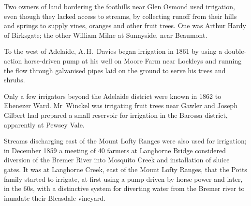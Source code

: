 Two owners of land bordering the foothills near Glen Osmond used
irrigation, even though they lacked access to streams, by collecting
runoff from their hills and springs to supply vines, oranges and other
fruit trees.  One was Arthur Hardy of Birksgate; the other William
Milne at Sunnyside, near Beaumont.

To the west of Adelaide, A.\,H.~Davies began irrigation in 1861 by
using a double-action horse-driven pump at his well on Moore Farm near
Lockleys and running the flow through galvanised pipes laid on the
ground to serve his trees and shrubs.

Only a few irrigators beyond the Adelaide district were known in 1862
to Ebenezer Ward.  Mr~Winckel was irrigating fruit trees near Gawler
and Joseph Gilbert had prepared a small reservoir for irrigation in
the Barossa district, apparently at Pewsey
Vale.

Streams discharging east of the Mount Lofty Ranges were also used for
irrigation; in December 1859 a meeting of 40 farmers at Langhorne
Bridge considered diversion of the Bremer River into Mosquito Creek
and installation of sluice gates.  It was at Langhorne Creek, east of
the Mount Lofty Ranges, that the Potts family started to irrigate, at
first using a pump driven by horse power and later, in the 60s, with a
distinctive system for diverting water from the Bremer river to
inundate their Bleasdale vineyard.

